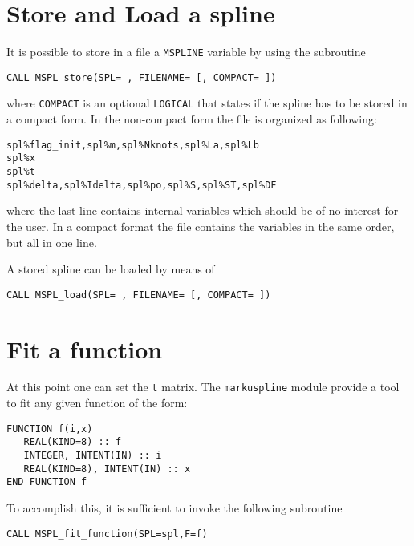 \documentclass[11pt,a4paper,twoside]{article}
\begin{document}
\section{Store and Load a spline}
It is possible to store in a file a \verb+MSPLINE+ variable by using the subroutine
\begin{verbatim}
CALL MSPL_store(SPL= , FILENAME= [, COMPACT= ])
\end{verbatim}
where \verb+COMPACT+ is an optional \verb+LOGICAL+ that states if the spline has to be stored in a compact form.
In the non-compact form the file is organized as following:
\begin{verbatim}
spl%flag_init,spl%m,spl%Nknots,spl%La,spl%Lb
spl%x
spl%t
spl%delta,spl%Idelta,spl%po,spl%S,spl%ST,spl%DF
\end{verbatim}
where the last line contains internal variables which should be of no interest for the user.
In a compact format the file contains the variables in the same order, but all in one line.

A stored spline can be loaded by means of
\begin{verbatim}
CALL MSPL_load(SPL= , FILENAME= [, COMPACT= ])
\end{verbatim}

\section{Fit a function}
At this point one can set the \verb+t+ matrix.
The \verb+markuspline+ module provide a tool to fit any given function of the form:
\begin{verbatim}
FUNCTION f(i,x)
   REAL(KIND=8) :: f
   INTEGER, INTENT(IN) :: i
   REAL(KIND=8), INTENT(IN) :: x
END FUNCTION f
\end{verbatim}
To accomplish this, it is sufficient to invoke the following subroutine
\begin{verbatim}
CALL MSPL_fit_function(SPL=spl,F=f)
\end{verbatim}
\end{document}
